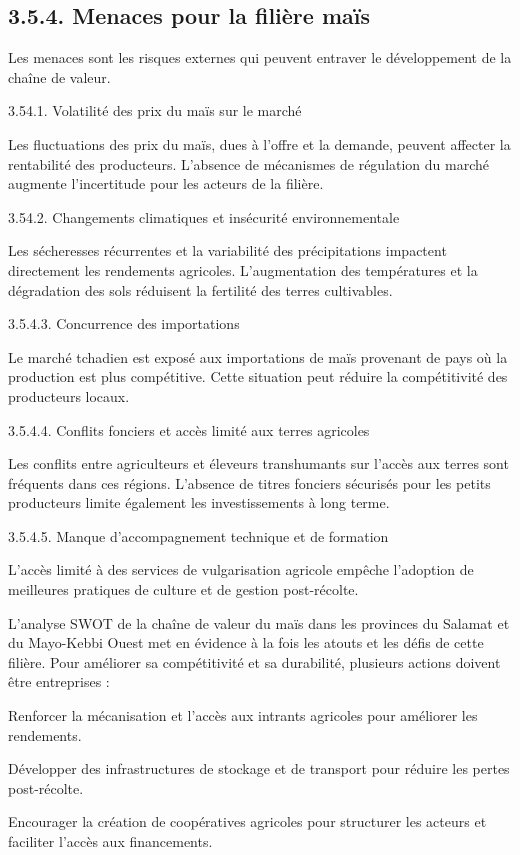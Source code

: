 \documentclass[12pt,oneside]{report}
\begin{document}
\subsection{3.5.4. Menaces pour la filière maïs}
Les menaces sont les risques externes qui peuvent entraver le développement de la chaîne de valeur.

3.54.1. Volatilité des prix du maïs sur le marché

Les fluctuations des prix du maïs, dues à l’offre et la demande, peuvent affecter la rentabilité des producteurs. L’absence de mécanismes de régulation du marché augmente l’incertitude pour les acteurs de la filière.

3.54.2. Changements climatiques et insécurité environnementale

Les sécheresses récurrentes et la variabilité des précipitations impactent directement les rendements agricoles. L’augmentation des températures et la dégradation des sols réduisent la fertilité des terres cultivables.

3.5.4.3. Concurrence des importations

Le marché tchadien est exposé aux importations de maïs provenant de pays où la production est plus compétitive. Cette situation peut réduire la compétitivité des producteurs locaux.

3.5.4.4. Conflits fonciers et accès limité aux terres agricoles

Les conflits entre agriculteurs et éleveurs transhumants sur l’accès aux terres sont fréquents dans ces régions. L’absence de titres fonciers sécurisés pour les petits producteurs limite également les investissements à long terme.

3.5.4.5. Manque d’accompagnement technique et de formation

L’accès limité à des services de vulgarisation agricole empêche l’adoption de meilleures pratiques de culture et de gestion post-récolte.

L’analyse SWOT de la chaîne de valeur du maïs dans les provinces du Salamat et du Mayo-Kebbi Ouest met en évidence à la fois les atouts et les défis de cette filière. Pour améliorer sa compétitivité et sa durabilité, plusieurs actions doivent être entreprises :

Renforcer la mécanisation et l’accès aux intrants agricoles pour améliorer les rendements.

Développer des infrastructures de stockage et de transport pour réduire les pertes post-récolte.

Encourager la création de coopératives agricoles pour structurer les acteurs et faciliter l’accès aux financements.
\end{document}
